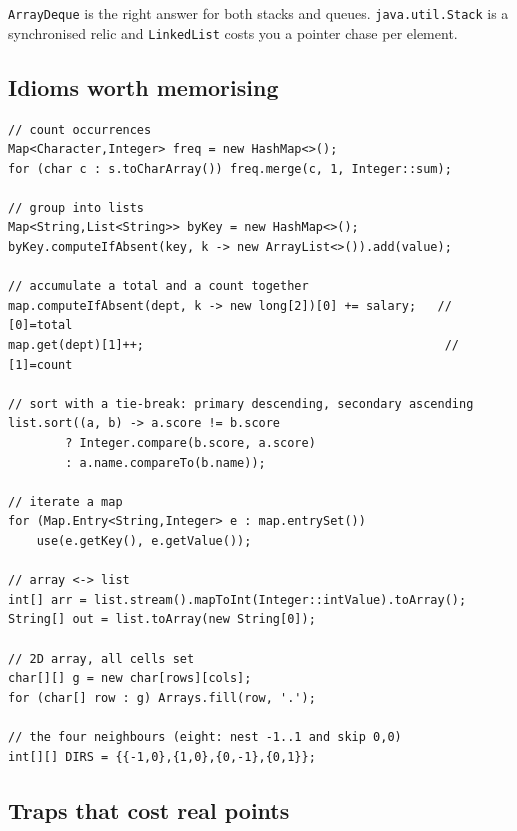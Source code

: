 \medskip
\noindent\texttt{ArrayDeque} is the right answer for both stacks and queues.
\texttt{java.util.Stack} is a synchronised relic and \texttt{LinkedList} costs
you a pointer chase per element.

\subsection*{Idioms worth memorising}

\begin{lstlisting}[style=java,numbers=none]
// count occurrences
Map<Character,Integer> freq = new HashMap<>();
for (char c : s.toCharArray()) freq.merge(c, 1, Integer::sum);

// group into lists
Map<String,List<String>> byKey = new HashMap<>();
byKey.computeIfAbsent(key, k -> new ArrayList<>()).add(value);

// accumulate a total and a count together
map.computeIfAbsent(dept, k -> new long[2])[0] += salary;   // [0]=total
map.get(dept)[1]++;                                          // [1]=count

// sort with a tie-break: primary descending, secondary ascending
list.sort((a, b) -> a.score != b.score
        ? Integer.compare(b.score, a.score)
        : a.name.compareTo(b.name));

// iterate a map
for (Map.Entry<String,Integer> e : map.entrySet())
    use(e.getKey(), e.getValue());

// array <-> list
int[] arr = list.stream().mapToInt(Integer::intValue).toArray();
String[] out = list.toArray(new String[0]);

// 2D array, all cells set
char[][] g = new char[rows][cols];
for (char[] row : g) Arrays.fill(row, '.');

// the four neighbours (eight: nest -1..1 and skip 0,0)
int[][] DIRS = {{-1,0},{1,0},{0,-1},{0,1}};
\end{lstlisting}

\subsection*{Traps that cost real points}

